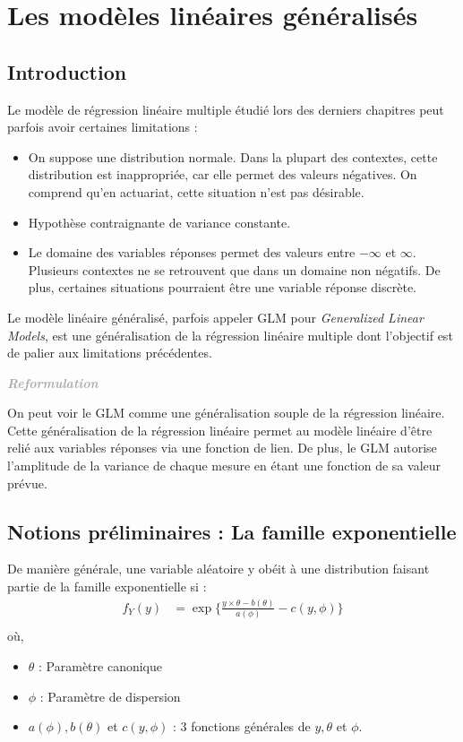 \documentclass[11pt,french]{report}
\newenvironment{moreInfo}[1]
	{\begin{mdframed}
	\textcolor{darkgray}{\huge \raisebox{-3.5pt}{\faInfo} 
	\hspace{0.5cm} \large\bfseries #1}\\[5pt]
	\normalsize
	\makebox[0.1\textwidth][l]{}	
	\begin{minipage}{10cm}}
	{	\end{minipage}
	\end{mdframed}}
\begin{document}
\chapter{Les modèles linéaires généralisés}
\section{Introduction}
Le modèle de régression linéaire multiple étudié lors des derniers chapitres peut parfois avoir certaines limitations : 

\bigskip
\begin{itemize}
\item On suppose une distribution normale. Dans la plupart des contextes, cette distribution est inappropriée, car elle permet des valeurs négatives. On comprend qu'en actuariat, cette situation n'est pas désirable.
\item Hypothèse contraignante de variance constante.
\item Le domaine des variables réponses permet des valeurs entre $-\infty$ et $\infty$. Plusieurs contextes ne se retrouvent que dans un domaine non négatifs. De plus, certaines situations pourraient être une variable réponse discrète.
\end{itemize}

\bigskip
Le modèle linéaire généralisé, parfois appeler GLM pour \emph{Generalized Linear Models}, est une généralisation de la régression linéaire multiple dont l'objectif est de palier aux limitations précédentes.

\begin{moreInfo}{\emph{Reformulation}}
     On peut voir le GLM comme une généralisation souple de la régression linéaire. Cette généralisation de la régression linéaire permet au modèle linéaire d'être relié aux variables réponses via une fonction de lien. De plus, le GLM autorise l'amplitude de la variance de chaque mesure en étant une fonction de sa valeur prévue.
\end{moreInfo}

\section{Notions préliminaires : La famille exponentielle}
De manière générale, une variable aléatoire y obéit à une distribution faisant partie de la famille exponentielle si :
\begin{align*}
f_Y(y) &= \exp\bigg\lbrace \frac{y \times \theta - b(\theta)}{a(\phi)} - c(y, \phi) \bigg\rbrace \\
\end{align*}
où,
\begin{itemize}
     \item $\theta$ : Paramètre canonique
     \item $\phi $ : Paramètre de dispersion
     \item $a(\phi), b(\theta)$ et $c(y, \phi)$ : 3 fonctions générales de $y, \theta$ et $\phi$.
\end{itemize}
\end{document}
